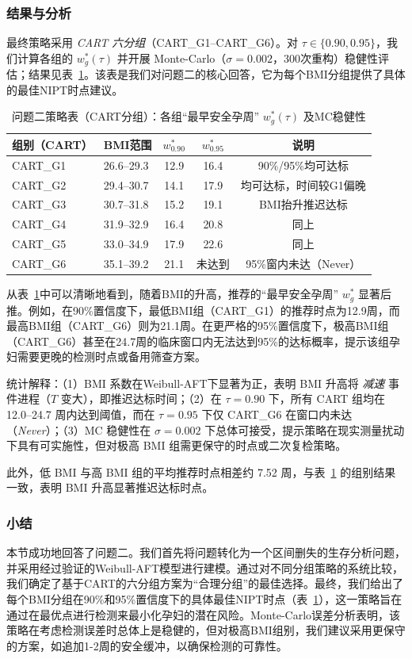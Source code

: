 \documentclass[withoutpreface]{cumcmthesis}
\begin{document}
\subsubsection{结果与分析}
最终策略采用 \emph{CART 六分组}（CART\_G1–CART\_G6）。对 $\tau\in\{0.90,0.95\}$，我们计算各组的 $w_g^{*}(\tau)$ 并开展 Monte-Carlo（$\sigma=0.002$，300次重构）稳健性评估；结果见表~\ref{tab:p2_policy}。该表是我们对问题二的核心回答，它为每个BMI分组提供了具体的最佳NIPT时点建议。
\begin{table}[htbp]
\centering
\caption{问题二策略表（CART分组）：各组“最早安全孕周” $w_g^{*}(\tau)$ 及MC稳健性}
\label{tab:p2_policy}
\begin{tabular}{@{}llccc@{}}
\toprule
组别（CART） & BMI范围 & $w_{0.90}^{*}$ & $w_{0.95}^{*}$ & 说明 \\
\midrule
CART\_G1 & 26.6--29.3 & 12.9 & 16.4 & 90\%/95\%均可达标 \\
CART\_G2 & 29.4--30.7 & 14.1 & 17.9 & 均可达标，时间较G1偏晚 \\
CART\_G3 & 30.7--31.8 & 15.2 & 19.1 & BMI抬升推迟达标 \\
CART\_G4 & 31.9--32.9 & 16.4 & 20.8 & 同上 \\
CART\_G5 & 33.0--34.9 & 17.9 & 22.6 & 同上 \\
CART\_G6 & 35.1--39.2 & 21.1 & 未达到 & 95\%窗内未达（Never） \\
\bottomrule
\end{tabular}
\end{table}

从表~\ref{tab:p2_policy}中可以清晰地看到，随着BMI的升高，推荐的“最早安全孕周” $w_g^{*}$ 显著后推。例如，在90\%置信度下，最低BMI组（CART\_G1）的推荐时点为12.9周，而最高BMI组（CART\_G6）则为21.1周。在更严格的95\%置信度下，极高BMI组（CART\_G6）甚至在24.7周的临床窗口内无法达到95\%的达标概率，提示该组孕妇需要更晚的检测时点或备用筛查方案。

统计解释：（1）BMI 系数在Weibull-AFT下显著为正，表明 BMI 升高将 \emph{减速} 事件进程（$T$ 变大），即推迟达标时间；（2）在 $\tau=0.90$ 下，所有 CART 组均在 12.0–24.7 周内达到阈值，而在 $\tau=0.95$ 下仅 CART\_G6 在窗口内未达（\emph{Never}）；（3）MC 稳健性在 $\sigma=0.002$ 下总体可接受，提示策略在现实测量扰动下具有可实施性，但对极高 BMI 组需更保守的时点或二次复检策略。

此外，低 BMI 与高 BMI 组的平均推荐时点相差约 \num{7.52} 周，与表~\ref{tab:p2_policy} 的组别结果一致，表明 BMI 升高显著推迟达标时点。
\subsubsection{小结}
本节成功地回答了问题二。我们首先将问题转化为一个区间删失的生存分析问题，并采用经过验证的Weibull-AFT模型进行建模。通过对不同分组策略的系统比较，我们确定了基于CART的六分组方案为“合理分组”的最佳选择。最终，我们给出了每个BMI分组在90\%和95\%置信度下的具体最佳NIPT时点（表~\ref{tab:p2_policy}），这一策略旨在通过在最优点进行检测来最小化孕妇的潜在风险。Monte-Carlo误差分析表明，该策略在考虑检测误差时总体上是稳健的，但对极高BMI组别，我们建议采用更保守的方案，如追加1-2周的安全缓冲，以确保检测的可靠性。
\end{document}

